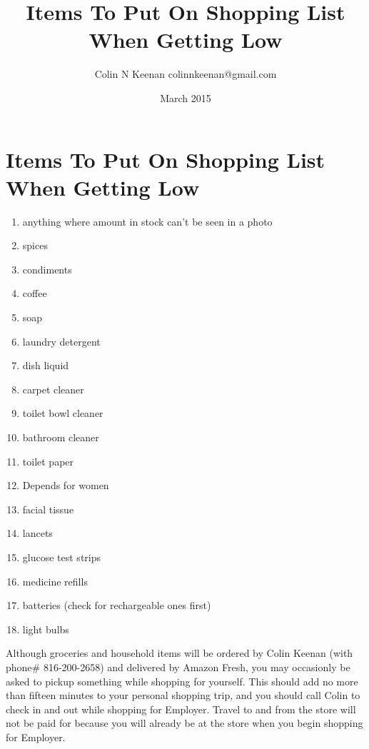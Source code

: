 \documentclass[12pt,letterpaper]{article}
\newcommand{\mytitle}{Items To Put On Shopping List When Getting Low}
\begin{document}
\title{\mytitle{}}
\author{Colin N Keenan colinnkeenan@gmail.com}
\date{March 2015}
\section*{\mytitle{}}
\begin{enumerate}
	\item anything where amount in stock can't be seen in a photo
	\item spices
	\item condiments
	\item coffee
	\item soap
	\item laundry detergent
	\item dish liquid
	\item carpet cleaner
	\item toilet bowl cleaner
	\item bathroom cleaner
	\item toilet paper
	\item Depends for women
	\item facial tissue
	\item lancets
	\item glucose test strips
	\item medicine refills
	\item batteries (check for rechargeable ones first)
	\item light bulbs
\end{enumerate}
Although groceries and household items will be ordered by Colin Keenan (with phone# 816-200-2658) and delivered by Amazon Fresh, you may occasionly be asked to pickup something while shopping for yourself. This should add no more than fifteen minutes to your personal shopping trip, and you should call Colin to check in and out while shopping for Employer. Travel to and from the store will not be paid for because you will already be at the store when you begin shopping for Employer. 
\end{document}
